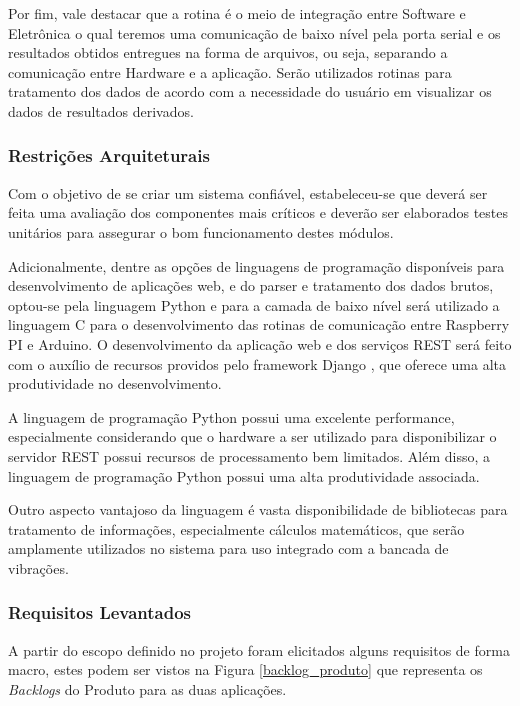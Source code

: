 Por fim, vale destacar que a rotina é o meio de integração entre Software e Eletrônica o qual teremos uma comunicação
de baixo nível pela porta serial e os resultados obtidos entregues na forma de arquivos, ou seja, separando a comunicação 
entre Hardware e a aplicação. Serão utilizados rotinas para tratamento dos dados de acordo com a necessidade do usuário em 
visualizar os dados de resultados derivados.

\subsubsection*{\textbf{Restrições Arquiteturais}}
Com o objetivo de se criar um sistema confiável, estabeleceu-se que deverá ser feita uma avaliação dos componentes mais críticos 
e deverão ser elaborados testes unitários para assegurar o bom funcionamento destes módulos.

Adicionalmente, dentre as opções de linguagens de programação disponíveis para desenvolvimento de aplicações web, e do parser e 
tratamento dos dados brutos, optou-se pela linguagem Python e para a camada de baixo nível será utilizado a linguagem C para o 
desenvolvimento  das rotinas de comunicação entre Raspberry PI e Arduino. O desenvolvimento da aplicação web e dos serviços REST 
será feito com o auxílio de recursos providos pelo framework Django \footnotemark, que oferece uma alta produtividade no 
desenvolvimento.

A linguagem de programação Python possui uma excelente performance, especialmente considerando que o hardware a ser utilizado 
para disponibilizar o servidor REST possui recursos de processamento bem limitados. Além disso, a linguagem de programação Python 
possui uma alta produtividade associada.

Outro aspecto vantajoso da linguagem é vasta disponibilidade de bibliotecas para tratamento de informações, especialmente cálculos
matemáticos, que serão amplamente utilizados no sistema para uso integrado com a bancada de vibrações.
\newpage
\subsubsection*{\textbf{Requisitos Levantados}}
A partir do escopo definido no projeto foram elicitados alguns requisitos de forma macro, estes podem ser vistos na 
Figura \ref{backlog_produto} que representa os \textit{Backlogs} do Produto para as duas aplicações.

